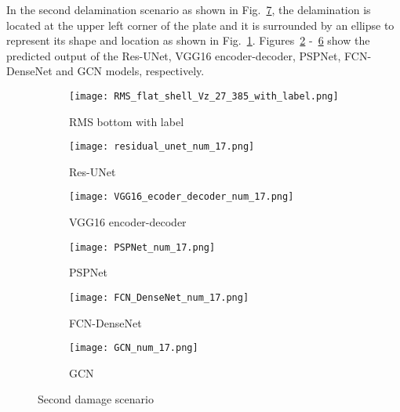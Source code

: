 In the second delamination scenario as shown in Fig.~\ref{fig:385_softmax}, the delamination is located at the upper left corner of the plate and it is surrounded by an ellipse to represent its shape and location as shown in Fig.~\ref{fig:RMS_flat_shell_Vz_385}.
Figures~\ref{fig:Unet_Pred__softmax_385} -~\ref{fig:gcn_pred_385} show the predicted output of the Res-UNet, VGG16 encoder-decoder, PSPNet, FCN-DenseNet and GCN models, respectively. 
\begin{figure}[!h]
	\centering
	\begin{subfigure}[b]{0.47\textwidth}
		\centering
		\texttt{[image: RMS\_flat\_shell\_Vz\_27\_385\_with\_label.png]}
		\caption{RMS bottom with label}
		\label{fig:RMS_flat_shell_Vz_385}
	\end{subfigure}
	\hfill
	\begin{subfigure}[b]{0.47\textwidth}
		\centering
		\texttt{[image: residual\_unet\_num\_17.png]}
		\caption{Res-UNet}
		\label{fig:Unet_Pred__softmax_385}
	\end{subfigure}
	\hfill
	\begin{subfigure}[b]{0.47\textwidth}
		\centering
		\texttt{[image: VGG16\_ecoder\_decoder\_num\_17.png]}
		\caption{VGG16 encoder-decoder}			\label{fig:vgg16_pred__softmax_385}			
	\end{subfigure}
	\hfill
	\begin{subfigure}[b]{0.47\textwidth}
		\centering
		\texttt{[image: PSPNet\_num\_17.png]}
		\caption{PSPNet}
		\label{fig:pspnet_pred__softmax_385}
	\end{subfigure}	
	\hfill
	\begin{subfigure}[b]{0.47\textwidth}
		\centering
		\texttt{[image: FCN\_DenseNet\_num\_17.png]}
		\caption{FCN-DenseNet}
		\label{fig:fcn_densenet_pred__softmax_385}
	\end{subfigure}	
	\hfill
	\begin{subfigure}[b]{0.47\textwidth}
		\centering
		\texttt{[image: GCN\_num\_17.png]}
		\caption{GCN}
		\label{fig:gcn_pred_385}
	\end{subfigure}
	\caption{Second damage scenario}
	\label{fig:385_softmax}
\end{figure}
